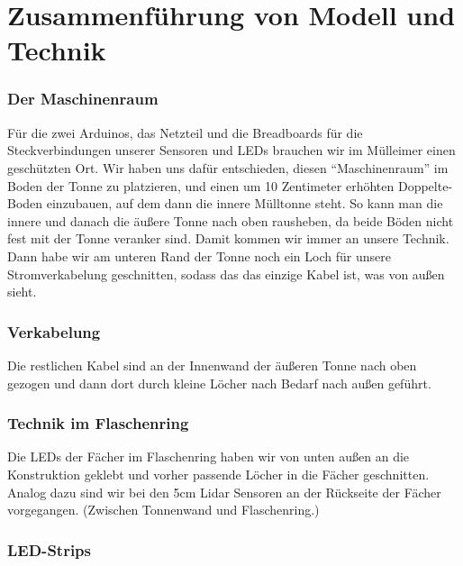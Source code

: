 \section{Zusammenführung von Modell und Technik}

    \subsubsection{Der Maschinenraum}
        
        Für die zwei Arduinos, das Netzteil und die Breadboards für die Steckverbindungen unserer Sensoren und LEDs brauchen wir im Mülleimer einen geschützten Ort. Wir haben uns dafür entschieden, diesen \enquote{Maschinenraum} im Boden der Tonne zu platzieren, und einen um 10 Zentimeter erhöhten Doppelte-Boden einzubauen, auf dem dann die innere Mülltonne steht.
        So kann man die innere und danach die äußere Tonne nach oben rausheben, da beide Böden nicht fest mit der Tonne veranker sind.
        Damit kommen wir immer an unsere Technik.
        Dann habe wir am unteren Rand der Tonne noch ein Loch für unsere Stromverkabelung geschnitten, sodass das das einzige Kabel ist, was von außen sieht.

    \subsubsection{Verkabelung}

        Die restlichen Kabel sind an der Innenwand der äußeren Tonne nach oben gezogen und dann dort durch kleine Löcher nach Bedarf nach außen geführt.


    \subsubsection{Technik im Flaschenring}

        Die LEDs der Fächer im Flaschenring haben wir von unten außen an die Konstruktion geklebt und vorher passende Löcher in die Fächer geschnitten. Analog dazu sind wir bei den 5cm Lidar Sensoren an der Rückseite der Fächer vorgegangen. (Zwischen Tonnenwand und Flaschenring.)

    \subsubsection{LED-Strips}

